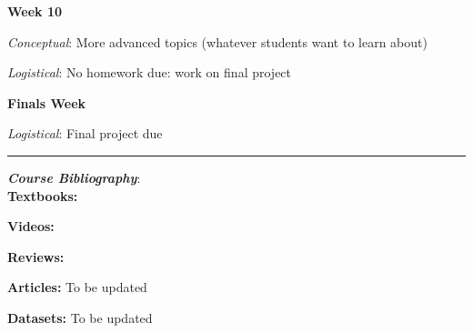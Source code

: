 \documentclass[12pt]{article}
\begin{document}
\textbf{Week 10}

\emph{Conceptual}: More advanced topics (whatever students want to learn about)

\emph{Logistical}: No homework due: work on final project

\textbf{Finals Week}

\emph{Logistical}: Final project due

\begin{center}
  \rule{\textwidth}{0.5pt}
\end{center}

\noindent\textbf{\emph{Course Bibliography}}:\\

\textbf{Textbooks:}

\newrefsection
\nocite{Mehta:2019,Abu-Mostafa:2012,Erdman:2021,Zeljko:2014,Calafiura:2022}
\printbibliography[heading=none]

\textbf{Videos:}

\newrefsection
\nocite{3blue1brown_neuralnetwork,3blue1brown_gradientdescent}
\printbibliography[heading=none]

\textbf{Reviews:}

\newrefsection
\nocite{Carleo:2019ptp}
\printbibliography[heading=none]

\textbf{Articles:} {\color{Orange} To be updated}

\newrefsection
\nocite{deOliveira:2015xxd,Aurisano:2016jvx,Komiske:2016rsd,Khan:2018opv,Zhou:2019,Moreno:2019neq,Ormiston:2020ele,Moreno:2021fvp}
\printbibliography[heading=none]

\textbf{Datasets:} {\color{Orange} To be updated}

\newrefsection
\nocite{hbb_dataset}
\printbibliography[heading=none]
\end{document}
